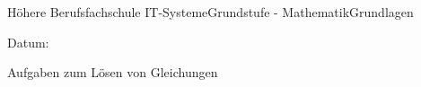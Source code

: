 \documentclass[oneside,openany,headings=optiontotoc,11pt,numbers=noenddot]{scrreprt}
\begin{document}
	\begin{worksheet}{Höhere Berufsfachschule IT-Systeme}{Grundstufe - Mathematik}{Grundlagen}
		\begin{framed}
			Datum:
		\end{framed}
		\begin{framed}
			Aufgaben zum Lösen von Gleichungen
		\end{framed}
	\end{worksheet}
\end{document}
